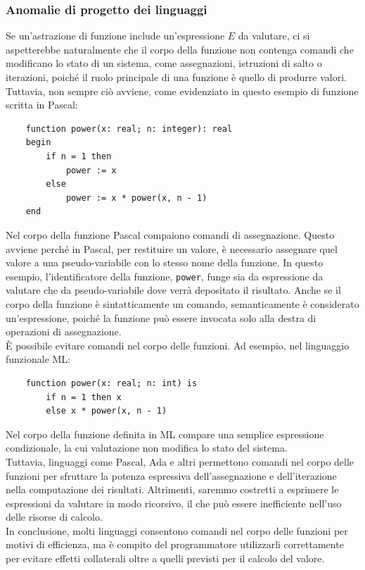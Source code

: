 \documentclass{article}
\begin{document}
	\subsubsection{Anomalie di progetto dei linguaggi}
	Se un'astrazione di funzione include un'espressione $E$ da valutare, ci si aspetterebbe naturalmente che il corpo della funzione non contenga comandi che modificano lo stato di un sistema, come assegnazioni, istruzioni di salto o iterazioni, poiché il ruolo principale di una funzione è quello di produrre valori.\\
	Tuttavia, non sempre ciò avviene, come evidenziato in questo esempio di funzione scritta in Pascal:
	\begin{verbatim}
	function power(x: real; n: integer): real
	begin
		if n = 1 then
			power := x
		else
			power := x * power(x, n - 1)
	end
	\end{verbatim}
	Nel corpo della funzione Pascal compaiono comandi di assegnazione. Questo avviene perché in Pascal, per restituire un valore, è necessario assegnare quel valore a una pseudo-variabile con lo stesso nome della funzione.
	In questo esempio, l'identificatore della funzione, \texttt{power}, funge sia da espressione da valutare che da pseudo-variabile dove verrà depositato il risultato.
	Anche se il corpo della funzione è sintatticamente un comando, semanticamente è considerato un'espressione, poiché la funzione può essere invocata solo alla destra di operazioni di assegnazione.
	\vspace{\baselineskip} \\
	È possibile evitare comandi nel corpo delle funzioni. Ad esempio, nel linguaggio funzionale ML:
	\begin{verbatim}
	function power(x: real; n: int) is
		if n = 1 then x
		else x * power(x, n - 1)
	\end{verbatim}
	Nel corpo della funzione definita in ML compare una semplice espressione condizionale, la cui valutazione non modifica lo stato del sistema.\\
	Tuttavia, linguaggi come Pascal, Ada e altri permettono comandi nel corpo delle funzioni per sfruttare la potenza espressiva dell'assegnazione e dell'iterazione nella computazione dei risultati. Altrimenti, saremmo costretti a esprimere le espressioni da valutare in modo ricorsivo, il che può essere inefficiente nell'uso delle risorse di calcolo.
    \vspace{\baselineskip} \\
	In conclusione, molti linguaggi consentono comandi nel corpo delle funzioni per motivi di efficienza, ma è compito del programmatore utilizzarli correttamente per evitare effetti collaterali oltre a quelli previsti per il calcolo del valore.
\end{document}
